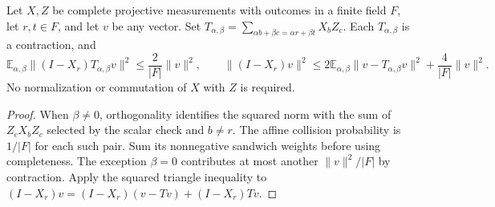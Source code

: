 \begin{theorem}
\label{thm:qld-retained-local-mismatch}
\leanok
Let $X,Z$ be complete projective measurements with outcomes in a finite
field $F$, let $r,t\in F$, and let $v$ be any vector. Set
$T_{\alpha,\beta}=\sum_{\alpha b+\beta c=\alpha r+\beta t}X_bZ_c$.
Each $T_{\alpha,\beta}$ is a contraction, and
\[
 \mathbb E_{\alpha,\beta}\|(I-X_r)T_{\alpha,\beta}v\|^2
 \leq \frac{2}{|F|}\|v\|^2,
 \qquad
 \|(I-X_r)v\|^2\leq
 2\mathbb E_{\alpha,\beta}\|v-T_{\alpha,\beta}v\|^2
 +\frac{4}{|F|}\|v\|^2.
\]
No normalization or commutation of $X$ with $Z$ is required.
\end{theorem}
\begin{proof}
\leanok
When $\beta\ne0$, orthogonality identifies the squared norm with the
sum of $Z_cX_bZ_c$ selected by the scalar check and $b\ne r$.
The affine collision probability is $1/|F|$ for each such pair. Sum its
nonnegative sandwich weights before using completeness. The exception
$\beta=0$ contributes at most another $\|v\|^2/|F|$ by contraction.
Apply the squared triangle inequality to
$(I-X_r)v=(I-X_r)(v-Tv)+(I-X_r)Tv$.
\end{proof}

